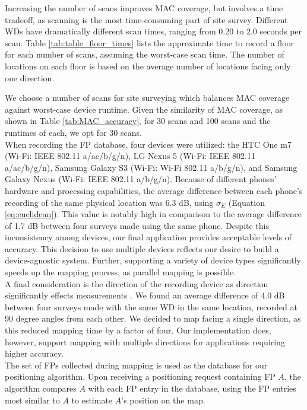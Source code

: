 \documentclass[conference]{IEEEtran}
\begin{document}
\indent Increasing the number of scans improves MAC coverage, but involves a time tradeoff, as scanning is the most time-consuming part of site survey. Different WDs have dramatically different scan times, ranging from 0.20 to 2.0 seconds per scan. Table \ref{tab:table_floor_times} lists the approximate time to record a floor for each number of scans, assuming the worst-case scan time. The number of locations on each floor is based on the average number of locations facing only one direction.

\indent We choose a number of scans for site surveying which balances MAC coverage against worst-case device runtime. Given the similarity of MAC coverage, as shown in Table \ref{tab:MAC_accuracy}, for 30 scans and 100 scans and the runtimes of each, we opt for 30 scans.\\
\indent When recording the FP database, four devices were utilized: the HTC One m7 (Wi-Fi: IEEE 802.11 a/ac/b/g/n), LG Nexus 5  (Wi-Fi: IEEE 802.11 a/ac/b/g/n), Samsung Galaxy S3 (Wi-Fi: Wi-Fi 802.11 a/b/g/n), and Samsung Galaxy Nexus (Wi-Fi: IEEE 802.11 a/b/g/n). Because of different phones' hardware and processing capabilities, the average difference between each phone's recording of the same physical location was 6.3 dB, using $\sigma_E$ (Equation \ref{eq:euclidean}). This value is notably high in comparison to the average difference of 1.7 dB between four surveys made using the same phone. Despite this inconsistency among devices, our final application provides acceptable levels of accuracy. This decision to use multiple devices reflects our desire to build a device-agnostic system. Further, supporting a variety of device types significantly speeds up the mapping process, as parallel mapping is possible.\\
\indent A final consideration is the direction of the recording device as direction significantly effects measurements \cite{Sayad}. We found an average difference of 4.0 dB between four surveys made with the same WD in the same location, recorded at 90 degree angles from each other. We decided to map facing a single direction, as this reduced mapping time by a factor of four. Our implementation does, however, support mapping with multiple directions for applications requiring higher accuracy.\\
\indent The set of FPs collected during mapping is used as the database for our positioning algorithm. Upon receiving a positioning request containing FP $A$, the algorithm compares $A$ with each FP entry in the database, using the FP entries most similar to $A$ to estimate $A$'s position on the map.
\end{document}
